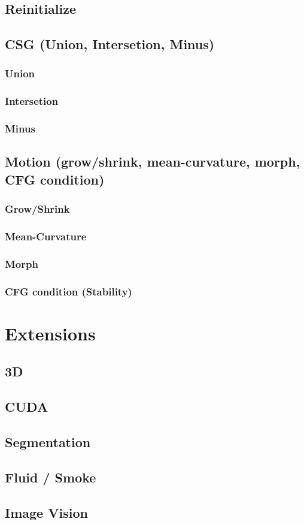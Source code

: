 \documentclass[a4paper]{memoir}
\begin{document}
\section{Reinitialize}

\section{CSG (Union, Intersetion, Minus)}
\subsection{Union}
\subsection{Intersetion}
\subsection{Minus}

\section{Motion (grow/shrink, mean-curvature, morph, CFG condition)}
\subsection{Grow/Shrink}
\subsection{Mean-Curvature}
\subsection{Morph}
\subsection{CFG condition (Stability)}

\chapter{Extensions}

\section{3D}
\section{CUDA}

\section{Segmentation}
  
\section{Fluid / Smoke}
\section{Image Vision}
\end{document}
